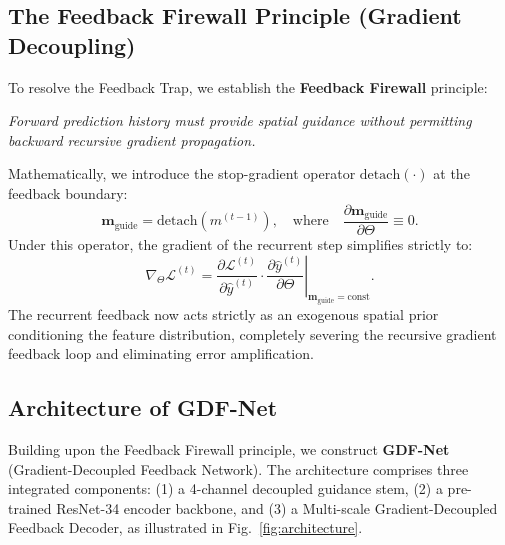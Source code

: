 \subsection{The Feedback Firewall Principle (Gradient Decoupling)}
To resolve the Feedback Trap, we establish the \textbf{Feedback Firewall} principle:
\begin{center}
  \textit{Forward prediction history must provide spatial guidance without permitting backward recursive gradient propagation.}
\end{center}
Mathematically, we introduce the stop-gradient operator $\text{detach}(\cdot)$ at the feedback boundary:
\begin{equation}
  \mathbf{m}_{\text{guide}} = \text{detach}\left(m^{(t-1)}\right), \quad \text{where} \quad \frac{\partial \mathbf{m}_{\text{guide}}}{\partial \Theta} \equiv 0.
\end{equation}
Under this operator, the gradient of the recurrent step simplifies strictly to:
\begin{equation}
  \nabla_\Theta \mathcal{L}^{(t)} = \frac{\partial \mathcal{L}^{(t)}}{\partial \hat{y}^{(t)}} \cdot \left. \frac{\partial \hat{y}^{(t)}}{\partial \Theta} \right|_{\mathbf{m}_{\text{guide}} = \text{const}}.
\end{equation}
The recurrent feedback now acts strictly as an exogenous spatial prior conditioning the feature distribution, completely severing the recursive gradient feedback loop and eliminating error amplification.

\subsection{Architecture of GDF-Net}
Building upon the Feedback Firewall principle, we construct \textbf{GDF-Net} (Gradient-Decoupled Feedback Network). The architecture comprises three integrated components: (1) a 4-channel decoupled guidance stem, (2) a pre-trained ResNet-34 encoder backbone, and (3) a Multi-scale Gradient-Decoupled Feedback Decoder, as illustrated in Fig.~\ref{fig:architecture}.




